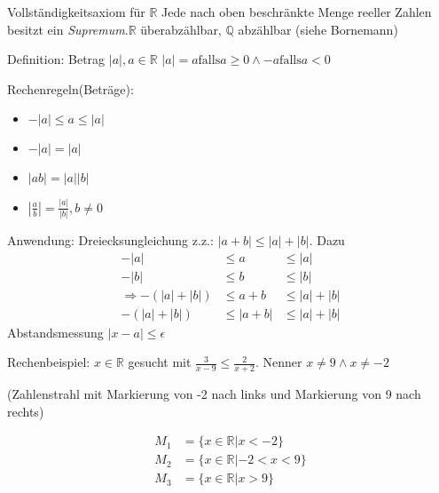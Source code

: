 \documentclass[a4paper,10pt]{book}
\begin{document}
Vollständigkeitsaxiom für $\mathbb{R}$
Jede nach oben beschränkte Menge reeller Zahlen besitzt ein \emph{Supremum}.$\mathbb{R}$ überabzählbar, $\mathbb{Q}$ abzählbar (siehe Bornemann)

Definition: Betrag $|a|, a \in \mathbb{R}$
$|a|=a \textrm{falls} a \geq 0 \land -a \textrm{falls} a<0$

Rechenregeln(Beträge):
\begin{itemize}
 \item $-|a|\leq a \leq |a|$
 \item $-|a| = |a|$
 \item $|ab| = |a||b|$
 \item $|\frac{a}{b}| = \frac{|a|}{|b|}, b\neq 0$
\end{itemize}

Anwendung: Dreiecksungleichung
z.z.: $|a+b| \leq |a|+|b|$. Dazu
\begin{align*}
-|a|&\leq a &\leq |a| \\
-|b|&\leq b &\leq |b| \\
\Rightarrow -(|a|+|b|)&\leq a+b &\leq |a|+|b| \\
-(|a|+|b|)&\leq |a+b| &\leq |a|+|b|
\end{align*}
Abstandsmessung $|x-a| \leq \epsilon$

Rechenbeispiel:
$x\in \mathbb{R}$ gesucht mit $\frac{3}{x-9} \leq \frac{2}{x+2}$. Nenner $x\neq9 \land x\neq -2$

(Zahlenstrahl mit Markierung von -2 nach links und Markierung von 9 nach rechts)

\begin{align*}
M_1 &= \{x \in \mathbb{R} | x < -2\} \\
M_2 &= \{x \in \mathbb{R} | -2 < x < 9\} \\
M_3 &= \{x \in \mathbb{R} | x > 9\}
\end{align*}
\end{document}
